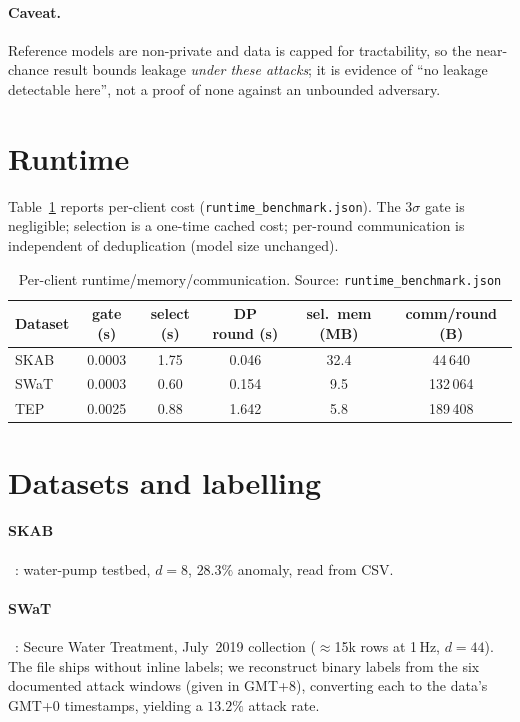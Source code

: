 \documentclass{article}
\providecommand{\botrule}{\bottomrule}%
\begin{document}
\paragraph{Caveat.} Reference models are non-private and data is capped for tractability, so
the near-chance result bounds leakage \emph{under these attacks}; it is evidence of ``no
leakage detectable here'', not a proof of none against an unbounded adversary.

\section{Runtime}\label{supp:runtime}
Table~\ref{tab:runtime} reports per-client cost (\texttt{runtime\_benchmark.json}). The
$3\sigma$ gate is negligible; selection is a one-time cached cost; per-round communication
is independent of deduplication (model size unchanged).

\begin{table}[h]\centering
\caption{Per-client runtime/memory/communication. Source:
\texttt{runtime\_benchmark.json}}\label{tab:runtime}
\begin{tabular}{@{}lccccc@{}}
\toprule
Dataset & gate (s) & select (s) & DP round (s) & sel.\ mem (MB) & comm/round (B) \\
\midrule
SKAB & 0.0003 & 1.75 & 0.046 & 32.4 & 44\,640 \\
SWaT & 0.0003 & 0.60 & 0.154 & 9.5  & 132\,064 \\
TEP  & 0.0025 & 0.88 & 1.642 & 5.8  & 189\,408 \\
\botrule
\end{tabular}
\end{table}

\section{Datasets and labelling}\label{supp:data}
\paragraph{SKAB}~\cite{katser2020skab}: water-pump testbed, $d{=}8$, $28.3\%$ anomaly,
read from CSV.
\paragraph{SWaT}~\cite{mathur2016swat,goh2016swat}: Secure Water Treatment, July~2019
collection ($\approx$15k rows at 1\,Hz, $d{=}44$). The file ships without inline labels;
we reconstruct binary labels from the six documented attack windows (given in GMT+8),
converting each to the data's GMT+0 timestamps, yielding a $13.2\%$ attack rate.
\end{document}
